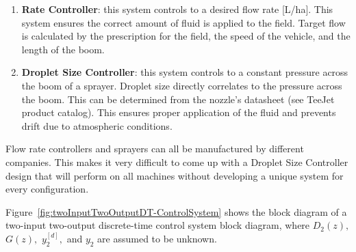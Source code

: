 \begin{enumerate}
\item \textbf{Rate Controller}: this system controls to a desired flow rate [L/ha].  This system ensures the correct amount of fluid is applied to the field.  Target flow is calculated by the prescription for the field, the speed of the vehicle, and the length of the boom. 

\item \textbf{Droplet Size Controller}: this system controls to a constant pressure across the boom of a sprayer.  Droplet size directly correlates to the pressure across the boom. This can be determined from the nozzle’s datasheet (see TeeJet product catalog).  This ensures proper application of the fluid and prevents drift due to atmospheric conditions.  

\end{enumerate}

Flow rate controllers and sprayers can all be manufactured by different companies.  This makes it very difficult to come up 
with a Droplet Size Controller design that will perform on all machines without developing a unique system for every configuration.

Figure~\ref{fig:twoInputTwoOutputDT-ControlSystem} shows the block diagram of a two-input two-output discrete-time control system block diagram, where  $D_2(z),$ $G(z),$ $y_2^{[d]},$ and $y_2$ are assumed to be unknown.
%

